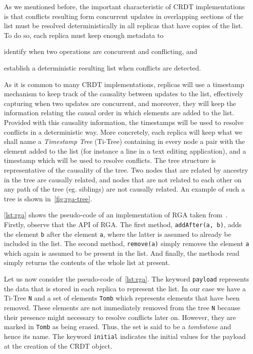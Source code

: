 As we mentioned before, the important characteristic of CRDT
implementations is that conflicts resulting form concurrent updates in
overlapping sections of the list must be resolved deterministically in
all replicas that have copies of the list.
%
To do so, each replica must keep enough metadata to
\begin{inparaenum}
\item identify when two operations are concurrent and conflicting, and
\item establish a deterministic resulting list when conflicts are detected.
\end{inparaenum}
%
As it is common to many CRDT implementations, replicas will use a
timestamp mechanism to keep track of the causality between updates to
the list, effectively capturing when two updates are concurrent, and
moreover, they will keep the information relating the causal order in
which elements are added to the list.
%
Provided with this causality information, the timestamps will be used
to resolve conflicts in a deterministic way.
%
More concretely, each replica will keep what we shall name a
\emph{Timestamp Tree} (Ti-Tree) containing in every node a pair with the
element added to the list (for instance a line in a text editing
application), and a timestamp which will be used to resolve conflicts.
The tree structure is representative of the causality of the tree.
Two nodes that are related by ancestry in the tree are causally
related, and nodes that are not related to each other on any path of
the tree (eg. siblings) are not causally related.
%
An example of such a tree is shown in~\ref{fig:rga-tree}.
%

\autoref{lst:rga} shows the pseudo-code of an implementation of RGA
taken from~\cite{}.
%
Firstly, observe that the API of RGA.
%
The first method, \lstinline|addAfter(a, b)|, adds the element
\lstinline|b| after the element \lstinline|a|, where the latter is
assumed to already be included in the list.
%
The second method, \lstinline|remove(a)| simply removes the element
\lstinline|a| which again is assumed to be present in the list.
%
And finally, the methods read simply returns the contents of the whole
list at present.

Let us now consider the pseudo-code of~\autoref{lst:rga}.
%
The keyword \lstinline|payload| represents the data that is stored in
each replica to represent the list.
%
In our case we have a Ti-Tree \lstinline|N| and a set of elements
\lstinline|Tomb| which represents elements that have been removed.
%
These elements are not immediately removed from the tree \lstinline|N|
because their presence might necessary to resolve conflicts later on.
%
However, they are marked in \lstinline|Tomb| as being erased.
%
Thus, the set is said to be a \emph{tombstone} and hence its name.
%
The keyword \lstinline|initial| indicates the initial values for the
payload at the creation of the CRDT object.

